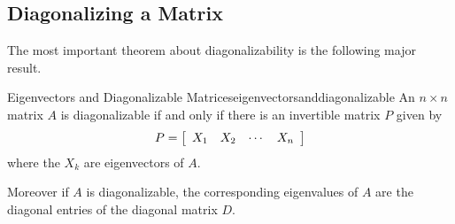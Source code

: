 \subsection{Diagonalizing a Matrix}

The most important theorem about diagonalizability is the following major result.

\begin{theorem}{Eigenvectors and Diagonalizable Matrices}{eigenvectorsanddiagonalizable}
An $n\times n$ matrix $A$ is diagonalizable if and only if there is an
invertible matrix $P$ given by 
\begin{equation*}
P=\left[
\begin{array}{cccc}
X_{1} & X_{2} & \cdots & X_{n}
\end{array}
\right]
\end{equation*}
where the $X_{k}$ are eigenvectors of $A$. 

Moreover if $A$ is diagonalizable, the corresponding eigenvalues of $A$ are the
diagonal entries of the diagonal matrix $D$.
\end{theorem}

